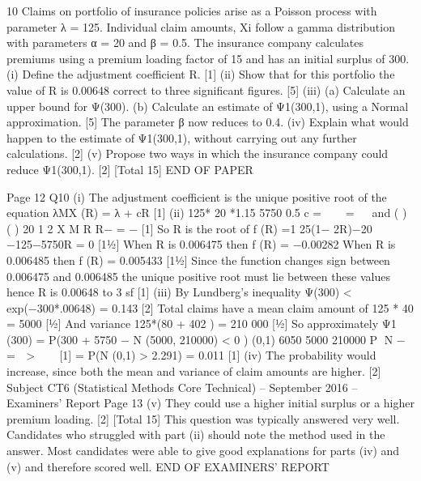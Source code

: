 10 Claims on portfolio of insurance policies arise as a Poisson process with parameter
λ = 125. Individual claim amounts, Xi follow a gamma distribution with parameters
α = 20 and β = 0.5.
The insurance company calculates premiums using a premium loading factor of 15%
and has an initial surplus of 300.
(i) Define the adjustment coefficient R. [1]
(ii) Show that for this portfolio the value of R is 0.00648 correct to three
significant figures. [5]
(iii) (a) Calculate an upper bound for Ψ(300).
(b) Calculate an estimate of Ψ1(300,1), using a Normal approximation. [5]
The parameter β now reduces to 0.4.
(iv) Explain what would happen to the estimate of Ψ1(300,1), without carrying out
any further calculations. [2]
(v) Propose two ways in which the insurance company could reduce Ψ1(300,1).
[2]
[Total 15]
END OF PAPER

Page 12
Q10 (i) The adjustment coefficient is the unique positive root of the equation
λMX (R) = λ + cR [1]
(ii) 125* 20 *1.15 5750
0.5
c =   =
   
and
( ) ( ) 20 1 2 X M R R− = − [1]
So R is the root of
f (R) =1 25(1− 2R)−20 −125−5750R = 0 [1½]
When R is 0.006475 then f (R) = −0.00282
When R is 0.006485 then f (R) = 0.005433 [1½]
Since the function changes sign between 0.006475 and 0.006485 the unique
positive root must lie between these values hence R is 0.00648 to 3 sf [1]
(iii) By Lundberg’s inequality Ψ(300) < exp(−300*.00648) = 0.143 [2]
Total claims have a mean claim amount of 125 * 40 = 5000 [½]
And variance 125*(80 + 402 ) = 210 000 [½]
So approximately
Ψ1 (300) = P(300 + 5750 − N (5000, 210000) < 0 )
(0,1) 6050 5000
210000
P N −  =  > 
 
[1]
= P(N (0,1) > 2.291) = 0.011 [1]
(iv) The probability would increase, since both the mean and variance of claim
amounts are higher. [2]
Subject CT6 (Statistical Methods Core Technical) – September 2016 – Examiners’ Report
Page 13
(v) They could use a higher initial surplus or a higher premium loading. [2]
[Total 15]
This question was typically answered very well. Candidates who struggled
with part (ii) should note the method used in the answer. Most candidates
were able to give good explanations for parts (iv) and (v) and therefore scored
well.
END OF EXAMINERS’ REPORT
